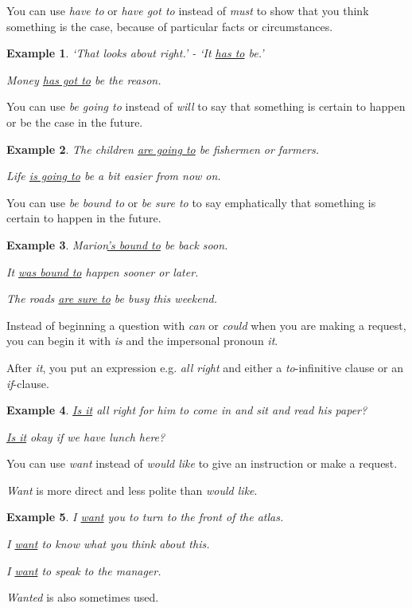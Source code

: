 \documentclass[oneside]{book}
\numberwithin{equation}{section}
\newtheorem{example}{Example}[section]
\begin{document}
%
\noindent{} You can use \textit{have to} or \textit{have got to} instead of \textit{must} to show that you think something is the case, because of particular facts or circumstances.
\begin{example}
    `That looks about right.' - `It \underline{has to} be.'
    
    Money \underline{has got to} be the reason.
\end{example}
%
\noindent{} You can use \textit{be going to} instead of \textit{will} to say that something is certain to happen or be the case in the future.
\begin{example}
    The children \underline{are going to} be fishermen or farmers.
    
    Life \underline{is going to} be a bit easier from now on.
\end{example}
%
\noindent{} You can use \textit{be bound to} or \textit{be sure to} to say emphatically that something is certain to happen in the future.
\begin{example}
    Marion\underline{'s bound to} be back soon.
    
    It \underline{was bound to} happen sooner or later.
    
    The roads \underline{are sure to} be busy this weekend.
\end{example}
%
\noindent{} Instead of beginning a question with \textit{can} or \textit{could} when you are making a request, you can begin it with \textit{is} and the impersonal pronoun \textit{it}.

After \textit{it}, you put an expression e.g. \textit{all right} and either a \textit{to}-infinitive clause or an \textit{if}-clause.
\begin{example}
    \underline{Is it} all right for him to come in and sit and read his paper?
    
    \underline{Is it} okay if we have lunch here?
\end{example}
%
\noindent{} You can use \textit{want} instead of \textit{would like} to give an instruction or make a request.

\textit{Want} is more direct and less polite than \textit{would like}.
\begin{example}
    I \underline{want} you to turn to the front of the atlas.
    
    I \underline{want} to know what you think about this.
    
    I \underline{want} to speak to the manager.
\end{example}
\textit{Wanted} is also sometimes used.
\end{document}
